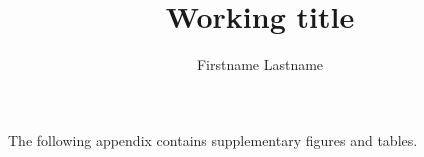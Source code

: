 \documentclass[a4paper, man, floatsintext, donotrepeattitle]{apa7}
\title{Working title}
\author{Firstname Lastname}
\affiliation{My Affiliation}
\begin{document}


\setcounter{secnumdepth}{3} %

\justifying \setlength{\parindent}{0.5in}

\tableofcontents

\newpage



\printbibliography


\appendix

\section{}

The following appendix contains supplementary figures and tables.

\vspace{2cm}




%
\end{document}
